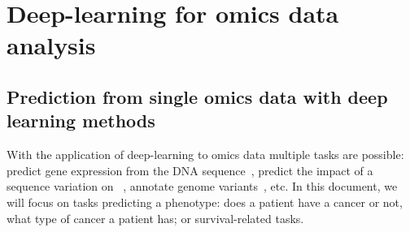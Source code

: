 \documentclass[../main.tex]{subfiles}
\begin{document}
\chapter{Deep-learning for omics data analysis}\label{chap:sota}
\minitocpagecentered

\section[Deep learning and single omics data]{Prediction from single omics data with deep learning methods}
	With the application of deep-learning to omics data multiple tasks are possible: predict gene expression from the DNA sequence~\cite{Avsec2021}, predict the impact of a sequence variation on ~\cite{Zeng2017}, annotate genome variants~\cite{Quang2014}, etc\@.
	In this document, we will focus on tasks predicting a phenotype: does a patient have a cancer or not, what type of cancer a patient has; or survival-related tasks.
\end{document}
